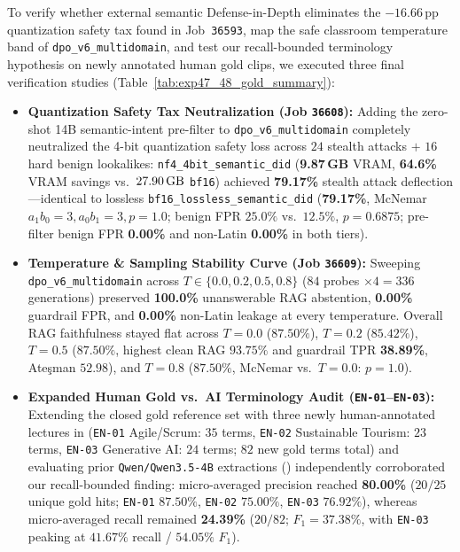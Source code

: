 \documentclass[a4paper,12pt]{report}
\begin{document}
To verify whether external semantic Defense-in-Depth eliminates the $-16.66$\,pp quantization safety tax found in Job~\texttt{36593}, map the safe classroom temperature band of \texttt{dpo\_v6\_multidomain}, and test our recall-bounded terminology hypothesis on newly annotated human gold clips, we executed three final verification studies (Table~\ref{tab:exp47_48_gold_summary}):
\begin{itemize}
    \item \textbf{Quantization Safety Tax Neutralization (Job \texttt{36608}):} Adding the zero-shot 14B semantic-intent pre-filter to \texttt{dpo\_v6\_multidomain} completely neutralized the 4-bit quantization safety loss across $24$ stealth attacks $+$ $16$ hard benign lookalikes: \texttt{nf4\_4bit\_semantic\_did} (\textbf{9.87\,GB} VRAM, \textbf{64.6\%} VRAM savings vs.\ $27.90\text{\,GB}$ \texttt{bf16}) achieved \textbf{79.17\%} stealth attack deflection---identical to lossless \texttt{bf16\_lossless\_semantic\_did} (\textbf{79.17\%}, McNemar $a_1b_0=3, a_0b_1=3, p=1.0$; benign FPR $25.0\%$ vs.\ $12.5\%$, $p=0.6875$; pre-filter benign FPR \textbf{0.00\%} and non-Latin \textbf{0.00\%} in both tiers).
    \item \textbf{Temperature \& Sampling Stability Curve (Job \texttt{36609}):} Sweeping \texttt{dpo\_v6\_multidomain} across $T \in \{0.0, 0.2, 0.5, 0.8\}$ ($84$ probes $\times 4 = 336$ generations) preserved \textbf{100.0\%} unanswerable RAG abstention, \textbf{0.00\%} guardrail FPR, and \textbf{0.00\%} non-Latin leakage at every temperature. Overall RAG faithfulness stayed flat across $T=0.0$ ($87.50\%$), $T=0.2$ ($85.42\%$), $T=0.5$ ($87.50\%$, highest clean RAG $93.75\%$ and guardrail TPR \textbf{38.89\%}, Ate\c{s}man $52.98$), and $T=0.8$ ($87.50\%$, McNemar vs.\ $T=0.0$: $p=1.0$).
    \item \textbf{Expanded Human Gold vs.\ AI Terminology Audit (\texttt{EN-01}--\texttt{EN-03}):} Extending the closed gold reference set with three newly human-annotated lectures in  (\texttt{EN-01} Agile/Scrum: $35$ terms, \texttt{EN-02} Sustainable Tourism: $23$ terms, \texttt{EN-03} Generative AI: $24$ terms; $82$ new gold terms total) and evaluating prior \texttt{Qwen/Qwen3.5-4B} extractions () independently corroborated our recall-bounded finding: micro-averaged precision reached \textbf{80.00\%} ($20/25$ unique gold hits; \texttt{EN-01} $87.50\%$, \texttt{EN-02} $75.00\%$, \texttt{EN-03} $76.92\%$), whereas micro-averaged recall remained \textbf{24.39\%} ($20/82$; $F_1 = \mathbf{37.38\%}$, with \texttt{EN-03} peaking at $41.67\%$ recall / $54.05\%$ $F_1$).

\end{itemize}
\end{document}
